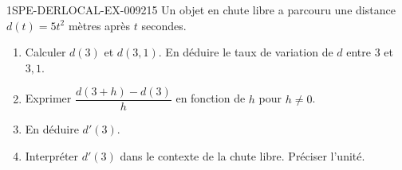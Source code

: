 \begin{exercice}{1SPE-DERLOCAL-EX-009}{2}{15}
Un objet en chute libre a parcouru une distance $d(t)=5t^2$ mètres après $t$ secondes.

\begin{enumerate}
  \item Calculer $d(3)$ et $d(3{,}1)$. En déduire le taux de variation de $d$ entre $3$ et $3{,}1$.
  \item Exprimer $\dfrac{d(3+h)-d(3)}{h}$ en fonction de $h$ pour $h\ne 0$.
  \item En déduire $d'(3)$.
  \item Interpréter $d'(3)$ dans le contexte de la chute libre. Préciser l'unité.
\end{enumerate}
\end{exercice}
